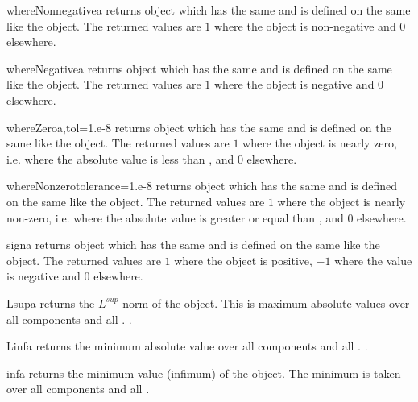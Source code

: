 \begin{funcdesc}{whereNonnegative}{a}
returns \Data object which has the same \Shape and is defined on
the same \FunctionSpace like the object. The returned values are $1$
where the object is non-negative and $0$ elsewhere.
\end{funcdesc}

\begin{funcdesc}{whereNegative}{a}
returns \Data object which has the same \Shape and is defined on
the same \FunctionSpace like the object. The returned values are $1$
where the object is negative and $0$ elsewhere.
\end{funcdesc}

\begin{funcdesc}{whereZero}{a,tol=1.e-8}
returns \Data object which has the same \Shape and is defined on
the same \FunctionSpace like the object. The returned values are $1$
where the object is nearly zero, i.e. where the absolute value is less
than , and $0$ elsewhere.
\end{funcdesc}

\begin{funcdesc}{whereNonzero}{tolerance=1.e-8}
returns \Data object which has the same \Shape and is defined on
the same \FunctionSpace like the object. The returned values are $1$
where the object is nearly non-zero, i.e. where the absolute value is
greater or equal than , and $0$ elsewhere.
\end{funcdesc}

\begin{funcdesc}{sign}{a}
returns \Data object which has the same \Shape and is defined on
the same \FunctionSpace like the object. The returned values are $1$
where the object is positive, $-1$ where the value is negative and $0$ elsewhere.
\end{funcdesc}

\begin{funcdesc}{Lsup}{a}
returns the $L^{sup}$-norm of the object. This is maximum absolute values over all components and all \DataSamplePoints. .
\end{funcdesc}
\begin{funcdesc}{Linf}{a}
returns the minimum absolute value over all components and all \DataSamplePoints. .
\end{funcdesc}
\begin{funcdesc}{inf}{a}
returns the minimum value (infimum) of the object. The minimum is
taken over all components and all \DataSamplePoints .  
\end{funcdesc}

